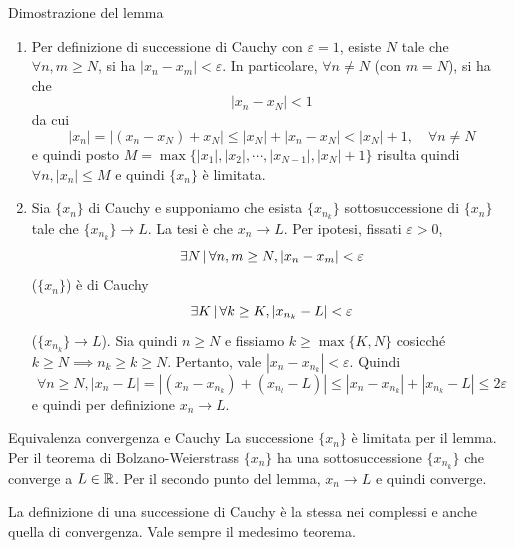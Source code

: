 \documentclass[a4paper]{article}
\begin{document}
\begin{snippetproof}{Dimostrazione del lemma}
    \begin{enumerate}
        \item Per definizione di successione di Cauchy con \(\varepsilon = 1\), esiste \(N\)
        tale che \(\forall n,m \geq N\), si ha \(|x_n-x_m| < \varepsilon\).
        In particolare, \(\forall n \neq N\) (con \(m=N\)), si ha che
        \[
            |x_n - x_N| < 1
        \]
        da cui
        \[
            |x_n| = |(x_n-x_N) + x_N| \leq |x_N| + |x_n-x_N| < |x_N| + 1, \quad \forall n \neq N
        \]
        e quindi posto \(M = \max\{|x_1|, |x_2|, \cdots, |x_{N-1}|, |x_N|+1\}\)
        risulta quindi \(\forall n, |x_n| \leq M\)
        e quindi \(\{x_n\}\) è limitata.
        \item Sia \(\{x_n\}\) di Cauchy e supponiamo che esista \(\{x_{n_k}\}\)
        sottosuccessione di \(\{x_n\}\) tale che \(\{x_{n_k}\} \to L\).
        La tesi è che \(x_n \to L\).
        Per ipotesi, fissati \(\varepsilon > 0\),
        \[
            \exists N \,|\, \forall n,m \geq N, |x_n - x_m| < \varepsilon
        \]
        (\(\{x_n\}\)) è di Cauchy
        \[
            \exists K \,|\, \forall k \geq K, |x_{n_k} - L| < \varepsilon
        \]
        (\(\{x_{n_k}\} \to L\)).
        Sia quindi \(n \geq N\) e fissiamo \(k \geq \max\{K, N\}\)
        cosicché \(k \geq N \implies n_k \geq k \geq N\).
        Pertanto, vale \(|x_n - x_{n_k}| < \varepsilon\).
        Quindi \[\forall n \geq N, |x_n-L| = |(x_n - x_{n_k}) + (x_{n_l} - L)| \leq |x_n - x_{n_k}| + |x_{n_k} - L| \leq 2 \varepsilon\]
        e quindi per definizione \(x_n \to L\).
    \end{enumerate}
\end{snippetproof}

\begin{snippetproof}{Equivalenza convergenza e Cauchy}
    La successione \(\{x_n\}\) è limitata per il lemma.
    Per il teorema di Bolzano-Weierstrass \(\{x_n\}\)
    ha una sottosuccessione \(\{x_{n_k}\}\) che converge a \(L \in \mathbb{R}\).
    Per il secondo punto del lemma, \(x_n \to L\) e quindi converge.
\end{snippetproof}

La definizione di una successione di Cauchy è la stessa nei complessi
e anche quella di convergenza. Vale sempre il medesimo teorema.
\end{document}
